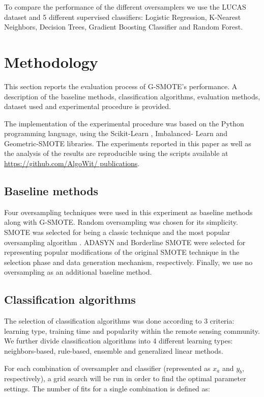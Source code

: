 \documentclass[parskip=full]{scrartcl}
\begin{document}
To compare the performance of the different oversamplers we use the LUCAS
dataset and 5 different supervised classifiers: Logistic Regression, K-Nearest
Neighbors, Decision Trees, Gradient Boosting Classifier and Random Forest.

\section{Methodology}

This section reports the evaluation process of G-SMOTE's performance. A
description of the baseline methods, classification algorithms, evaluation
methods, dataset used and experimental procedure is provided.

The implementation of the experimental procedure was based on the Python
programming language, using the Scikit-Learn \cite{Pedregosa2011}, Imbalanced-
Learn \cite{JMLR:v18:16-365} and Geometric-SMOTE \cite{Douzas2019} libraries.
The experiments reported in this paper as well as the analysis of the results
are reproducible using the scripts available at \url{https://github.com/AlgoWit/
publications}.

\subsection{Baseline methods}

Four oversampling techniques were used in this experiment as baseline methods
along with G-SMOTE. Random oversampling was chosen for its simplicity. SMOTE was
selected for being a classic technique and the most popular oversampling
algorithm \cite{Douzas2019}. ADASYN \cite{HaiboHe2008} and Borderline SMOTE
\cite{Han2005} were selected for representing popular modifications of the
original SMOTE technique in the selection phase and data generation mechanism,
respectively. Finally, we use no oversampling as an additional baseline method.

\subsection{Classification algorithms}

The selection of classification algorithms was done according to 3 criteria:
learning type, training time and popularity within the remote sensing community.
We further divide classification algorithms into 4 different learning types:
neighbors-based, rule-based, ensemble and generalized linear methods.

For each combination of oversampler and classifier (represented as $x_a$ and
$y_b$, respectively), a grid search will be run in order to find the optimal
parameter settings. The number of fits for a single combination  is defined as:
\end{document}
